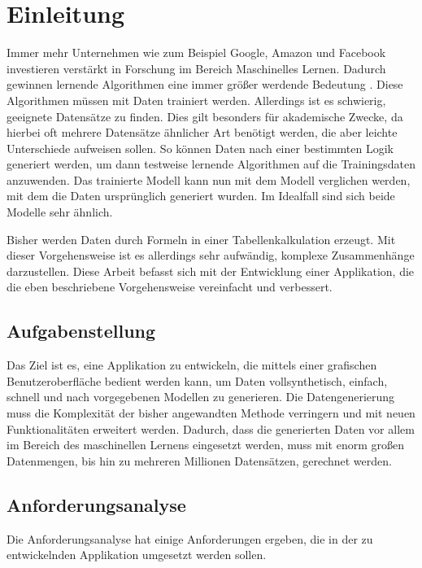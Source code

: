 
\chapter{Einleitung}

Immer mehr Unternehmen wie zum Beispiel Google, Amazon und Facebook investieren verstärkt in Forschung im Bereich Maschinelles Lernen. Dadurch gewinnen lernende Algorithmen eine immer größer werdende Bedeutung \cite{mengesonnentag:2018}. Diese Algorithmen müssen mit Daten trainiert werden. Allerdings ist es schwierig, geeignete Datensätze zu finden. Dies gilt besonders für akademische Zwecke, da hierbei oft mehrere Datensätze ähnlicher Art benötigt werden, die aber leichte Unterschiede aufweisen sollen. So können Daten nach einer bestimmten Logik generiert werden, um dann testweise lernende Algorithmen auf die Trainingsdaten anzuwenden. Das trainierte Modell kann nun mit dem Modell verglichen werden, mit dem die Daten ursprünglich generiert wurden. Im Idealfall sind sich beide Modelle sehr ähnlich.

Bisher werden Daten durch Formeln in einer Tabellenkalkulation erzeugt. Mit dieser Vorgehensweise ist es allerdings sehr aufwändig, komplexe Zusammenhänge darzustellen. Diese Arbeit befasst sich mit der Entwicklung einer Applikation, die die eben beschriebene Vorgehensweise vereinfacht und verbessert.

\section{Aufgabenstellung}

Das Ziel ist es, eine Applikation zu entwickeln, die mittels einer grafischen Benutzeroberfläche bedient werden kann, um Daten vollsynthetisch, einfach, schnell und nach vorgegebenen Modellen zu generieren. Die Datengenerierung muss die Komplexität der bisher angewandten Methode verringern und mit neuen Funktionalitäten erweitert werden. Dadurch, dass die generierten Daten vor allem im Bereich des maschinellen Lernens eingesetzt werden, muss mit enorm großen Datenmengen, bis hin zu mehreren Millionen  Datensätzen, gerechnet werden.

\section{Anforderungsanalyse}
\label{sec:anforderungsanalyse}

Die Anforderungsanalyse hat einige Anforderungen ergeben, die in der zu entwickelnden Applikation umgesetzt werden sollen.

